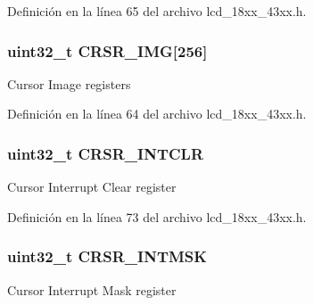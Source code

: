 Definición en la línea 65 del archivo lcd\+\_\+18xx\+\_\+43xx.\+h.

\subsubsection[{\texorpdfstring{C\+R\+S\+R\+\_\+\+I\+MG}{CRSR_IMG}}]{ uint32\+\_\+t C\+R\+S\+R\+\_\+\+I\+MG\mbox{[}256\mbox{]}}\hypertarget{struct_l_p_c___l_c_d___t_a8eaeffc060f29f737bc99ef752d5bfd6}{}\label{struct_l_p_c___l_c_d___t_a8eaeffc060f29f737bc99ef752d5bfd6}
Cursor Image registers 

Definición en la línea 64 del archivo lcd\+\_\+18xx\+\_\+43xx.\+h.

\subsubsection[{\texorpdfstring{C\+R\+S\+R\+\_\+\+I\+N\+T\+C\+LR}{CRSR_INTCLR}}]{ uint32\+\_\+t C\+R\+S\+R\+\_\+\+I\+N\+T\+C\+LR}\hypertarget{struct_l_p_c___l_c_d___t_a7012f2efd7683bb749ff1a094d2317ff}{}\label{struct_l_p_c___l_c_d___t_a7012f2efd7683bb749ff1a094d2317ff}
Cursor Interrupt Clear register 

Definición en la línea 73 del archivo lcd\+\_\+18xx\+\_\+43xx.\+h.

\subsubsection[{\texorpdfstring{C\+R\+S\+R\+\_\+\+I\+N\+T\+M\+SK}{CRSR_INTMSK}}]{ uint32\+\_\+t C\+R\+S\+R\+\_\+\+I\+N\+T\+M\+SK}\hypertarget{struct_l_p_c___l_c_d___t_ae78f57d6d6b02fe9759d20be63a18093}{}\label{struct_l_p_c___l_c_d___t_ae78f57d6d6b02fe9759d20be63a18093}
Cursor Interrupt Mask register 

